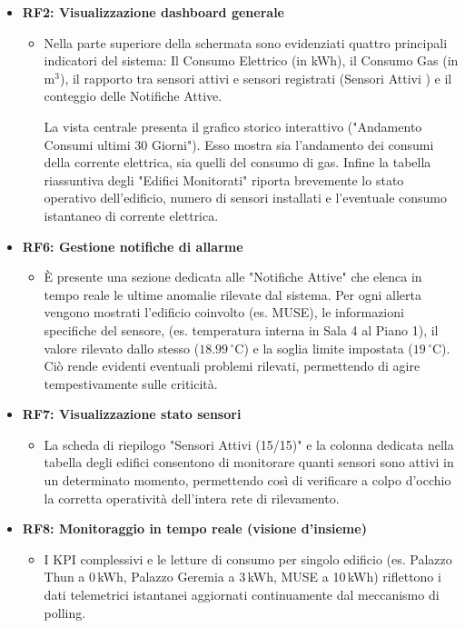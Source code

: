 \begin{itemize}
    \item \textbf{RF2: Visualizzazione dashboard generale}
    \begin{itemize}
        \item Nella parte superiore della schermata sono evidenziati quattro principali indicatori del sistema: Il Consumo Elettrico (in kWh), il Consumo Gas (in $\text{m}^3$), il rapporto  tra sensori attivi e sensori registrati (Sensori Attivi ) e il conteggio delle Notifiche Attive. 
        
        La vista centrale presenta il grafico storico interattivo ("Andamento Consumi ultimi 30 Giorni"). Esso mostra sia l'andamento dei consumi della corrente elettrica, sia quelli del consumo di gas. Infine la tabella riassuntiva degli "Edifici Monitorati" riporta brevemente lo stato operativo dell'edificio, numero di sensori installati e l'eventuale consumo istantaneo di corrente elettrica.
    \end{itemize}

    \item \textbf{RF6: Gestione notifiche di allarme}
    \begin{itemize}
        \item È presente una sezione dedicata alle "Notifiche Attive" che elenca in tempo reale le ultime anomalie rilevate dal sistema. Per ogni allerta vengono mostrati l'edificio coinvolto (es. MUSE), le informazioni specifiche del sensore, (es. temperatura interna in Sala 4 al Piano 1), il valore rilevato dallo stesso ($18.99\,^\circ\text{C}$) e la soglia limite impostata ($19\,^\circ\text{C}$).
        Ciò rende evidenti eventuali problemi rilevati, permettendo di agire tempestivamente sulle criticità.
    \end{itemize}

    \item \textbf{RF7: Visualizzazione stato sensori}
    \begin{itemize}
        \item La scheda di riepilogo "Sensori Attivi (15/15)" e la colonna dedicata nella tabella degli edifici consentono di monitorare quanti sensori sono attivi in un determinato momento, permettendo così di verificare a colpo d'occhio la corretta operatività dell'intera rete di rilevamento.
    \end{itemize}
    \newpage
    \item \textbf{RF8: Monitoraggio in tempo reale (visione d'insieme)}
    \begin{itemize}
        \item I KPI complessivi e le letture di consumo per singolo edificio (es. Palazzo Thun a 0\,kWh, Palazzo Geremia a 3\,kWh, MUSE a 10\,kWh) riflettono i dati telemetrici istantanei aggiornati continuamente dal meccanismo di polling.
    \end{itemize}


\end{itemize}
